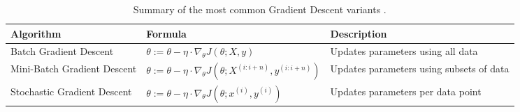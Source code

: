 \begin{table}[htb!]
\caption{Summary of the most common Gradient Descent variants \cite{goodfellow_deep_2016}.}
\label{Tables:GradientDescent}
\centering
\footnotesize
\begin{tabularx}{\textwidth}{@{}lXl@{}}
\toprule
\textbf{Algorithm} & \textbf{Formula} & \textbf{Description} \\
\midrule
Batch Gradient Descent & \(\theta := \theta - \eta \cdot \nabla_{\theta} J(\theta; X, y)\) & Updates parameters using all data \\
\addlinespace
Mini-Batch Gradient Descent & \(\theta := \theta - \eta \cdot \nabla_{\theta} J(\theta; X^{(i:i+n)}, y^{(i:i+n)})\) & Updates parameters using subsets of data \\
\addlinespace
Stochastic Gradient Descent & \(\theta := \theta - \eta \cdot \nabla_{\theta} J(\theta; x^{(i)}, y^{(i)})\) & Updates parameters per data point \\
\bottomrule
\end{tabularx}
\end{table}
